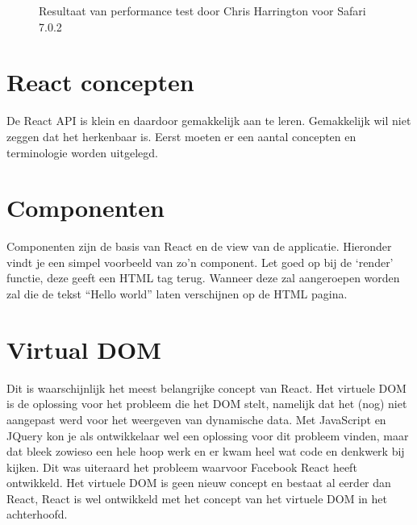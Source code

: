 \begin{figure}
{
		}
		\caption{Resultaat van performance test door Chris Harrington voor Safari 7.0.2}%
		\label{fig:ressafari}%
	\end{figure}
	
\section{React concepten}
		
	De React API is klein en daardoor gemakkelijk aan te leren. Gemakkelijk wil niet zeggen dat het herkenbaar is. Eerst moeten er een aantal concepten en terminologie worden uitgelegd.

\section{Componenten}\label{section:reactjscomponenten}
	
	Componenten zijn de basis van React en de view van de applicatie. Hieronder vindt je een simpel voorbeeld van zo’n component. Let goed op bij de `render' functie, deze geeft een HTML tag terug. Wanneer deze zal aangeroepen worden zal die de tekst ``Hello world'' laten verschijnen op de HTML pagina.
	

\section{Virtual DOM}\label{section:virtualdom}
	
	Dit is waarschijnlijk het meest belangrijke concept van React. Het virtuele DOM is de oplossing voor het probleem die het DOM stelt, namelijk dat het (nog) niet aangepast werd voor het weergeven van dynamische data. Met JavaScript en JQuery kon je als ontwikkelaar wel een oplossing voor dit probleem vinden, maar dat bleek zowieso een hele hoop werk en er kwam heel wat code en denkwerk bij kijken. Dit was uiteraard het probleem waarvoor Facebook React heeft ontwikkeld. Het virtuele DOM is geen nieuw concept en bestaat al eerder dan React, React is wel ontwikkeld met het concept van het virtuele DOM in het achterhoofd.
	
